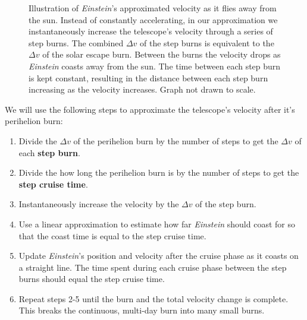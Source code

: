 \documentclass[12pt]{article} %
\begin{document}
\begin{figure}[H]
	\caption{Illustration of \textit{Einstein}'s approximated velocity as it flies away from the sun. Instead of constantly accelerating, in our approximation we instantaneously increase the telescope's velocity through a series of step burns. The combined $\Delta v$ of the step burns is equivalent to the $\Delta v$ of the solar escape burn. Between the burns the velocity drops as \textit{Einstein} coasts away from the sun. The time between each step burn is kept constant, resulting in the distance between each step burn increasing as the velocity increases. Graph not drawn to scale.}
\end{figure}

We will use the following steps to approximate the telescope's velocity after it's perihelion burn:

\begin{enumerate}
\item Divide the $\Delta v$ of the perihelion burn by the number of steps to get the $\Delta v$ of each \textbf{step burn}.
\item Divide the how long the perihelion burn is by the number of steps to get the \textbf{step cruise time}. 
\item Instantaneously increase the velocity by the $\Delta v$ of the step burn.
\item Use a linear approximation to estimate how far \textit{Einstein} should coast for so that the coast time is equal to the step cruise time.
\item Update \textit{Einstein}'s position and velocity after the cruise phase as it coasts on a straight line. The time spent during each cruise phase between the step burns should equal the step cruise time.
\item Repeat steps 2-5 until the burn and the total velocity change is complete. This breaks the continuous, multi-day burn into many small burns.
\end{enumerate}
\end{document}
